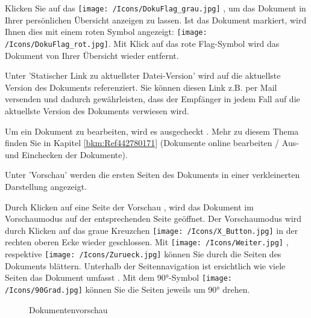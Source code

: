 Klicken Sie auf das \texttt{[image: /Icons/DokuFlag\_grau.jpg]} , um das Dokument in Ihrer persönlichen Übersicht anzeigen zu lassen. Ist das Dokument markiert, wird Ihnen dies mit einem roten Symbol angezeigt: \texttt{[image: /Icons/DokuFlag\_rot.jpg]}. Mit Klick auf das rote Flag-Symbol wird das Dokument von Ihrer Übersicht wieder entfernt. \newline

Unter 'Statischer Link zu aktuellster Datei-Version'  wird auf die aktuellste Version des Dokuments referenziert. Sie können diesen Link z.B. per Mail versenden und dadurch gewährleisten, dass der Empfänger in jedem Fall auf die aktuellste Version des Dokuments verwiesen wird.

Um ein Dokument zu bearbeiten, wird es ausgecheckt . Mehr zu diesem Thema finden Sie in Kapitel \ref{bkm:Ref442780171} (Dokumente online bearbeiten / Aus- und Einchecken der Dokumente).

\vspace{\baselineskip}

Unter 'Vorschau'  werden die ersten Seiten des Dokuments in einer verkleinerten Darstellung angezeigt.

\vspace{\baselineskip}

Durch Klicken auf eine Seite der Vorschau , wird das Dokument im Vorschaumodus auf der entsprechenden Seite geöffnet. Der Vorschaumodus wird durch Klicken auf das graue Kreuzchen \texttt{[image: /Icons/X\_Button.jpg]}  in der rechten oberen Ecke wieder geschlossen. Mit \texttt{[image: /Icons/Weiter.jpg]} , respektive \texttt{[image: /Icons/Zurueck.jpg]}  können Sie durch die Seiten des Dokuments blättern. Unterhalb der Seitennavigation ist ersichtlich wie viele Seiten das Dokument umfasst . Mit dem 90°-Symbol \texttt{[image: /Icons/90Grad.jpg]}  können Sie die Seiten jeweils um 90° drehen.

\begin{figure}[H]
\caption{Dokumentenvorschau}
\end{figure}

